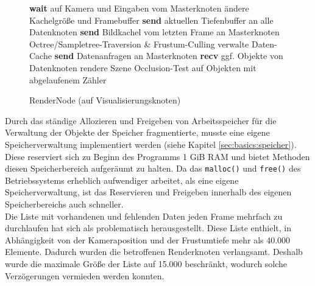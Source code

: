 \begin{figure}[ttt!]
\centering
 \begin{minipage}[t]{12cm}
\begin{algorithm}[H]
  \caption{RenderNode (auf Visualisierungsknoten)\label{alg:impl:rendernode}} 
    \begin{algorithmic} [1]
      \LOOP
	\STATE \textbf{wait} auf Kamera und Eingaben vom Masterknoten
	  \STATE ändere Kachelgröße und Framebuffer
	  \STATE \textbf{send} aktuellen Tiefenbuffer an alle Datenknoten
	\ENDIF
	\STATE \textbf{send} Bildkachel vom letzten Frame an Masterknoten
	\STATE Octree/Sampletree-Traversion \& Frustum-Culling
	\STATE verwalte Daten-Cache
	\STATE \textbf{send} Datenanfragen an Masterknoten
	\STATE \textbf{recv} ggf. Objekte von Datenknoten
	\STATE rendere Szene
	\STATE Occlusion-Test auf Objekten mit abgelaufenem Zähler
      \ENDLOOP
    \end{algorithmic}
\end{algorithm}
 \end{minipage}
\end{figure}
Durch das ständige Allozieren und Freigeben von Arbeitsspeicher für die Verwaltung der Objekte der Speicher fragmentierte, musste eine eigene Speicherverwaltung implementiert werden (siehe Kapitel \ref{sec:basics:speicher}). Diese reserviert sich zu Beginn des Programms 1 GiB RAM und bietet Methoden diesen Speicherbereich aufgeräumt zu halten. Da das \verb|malloc()| und \verb|free()| des Betriebssystems erheblich aufwendiger arbeitet, als eine eigene Speicherverwaltung, ist das Reservieren und Freigeben innerhalb des eigenen Speicherbereichs auch schneller.\\
Die Liste mit vorhandenen und fehlenden Daten jeden Frame mehrfach zu durchlaufen hat sich als problematisch herausgestellt. Diese Liste enthielt, in Abhängigkeit von der Kameraposition und der Frustumtiefe mehr als 40.000 Elemente. Dadurch wurden die betroffenen Renderknoten verlangsamt. Deshalb wurde die maximale Größe der Liste auf 15.000 beschränkt, wodurch solche Verzögerungen vermieden werden konnten.

